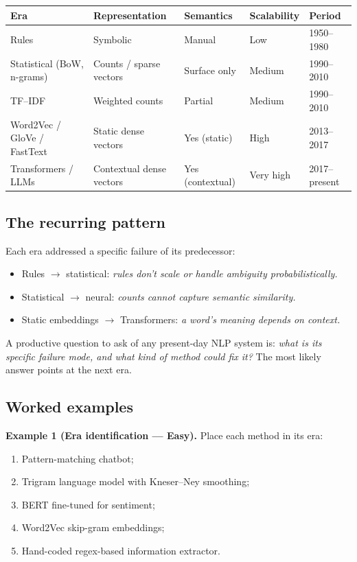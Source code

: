 \begin{center}
\begin{tabular}{|l|l|l|l|l|}
\hline
\textbf{Era} & \textbf{Representation} & \textbf{Semantics} & \textbf{Scalability} & \textbf{Period} \\
\hline
Rules & Symbolic & Manual & Low & 1950--1980 \\
Statistical (BoW, n-grams) & Counts / sparse vectors & Surface only & Medium & 1990--2010 \\
TF--IDF & Weighted counts & Partial & Medium & 1990--2010 \\
Word2Vec / GloVe / FastText & Static dense vectors & Yes (static) & High & 2013--2017 \\
Transformers / LLMs & Contextual dense vectors & Yes (contextual) & Very high & 2017--present \\
\hline
\end{tabular}
\end{center}

\subsection{The recurring pattern}

\begin{remark}
Each era addressed a specific failure of its predecessor:
\begin{itemize}
    \item Rules $\to$ statistical: \emph{rules don't scale or handle ambiguity probabilistically.}
    \item Statistical $\to$ neural: \emph{counts cannot capture semantic similarity.}
    \item Static embeddings $\to$ Transformers: \emph{a word's meaning depends on context.}
\end{itemize}
A productive question to ask of any present-day NLP system is: \emph{what is its specific failure mode, and what kind of method could fix it?} The most likely answer points at the next era.
\end{remark}

\subsection{Worked examples}

\textbf{Example 1 (Era identification --- Easy).}
Place each method in its era:
\begin{enumerate}
    \item Pattern-matching chatbot;
    \item Trigram language model with Kneser--Ney smoothing;
    \item BERT fine-tuned for sentiment;
    \item Word2Vec skip-gram embeddings;
    \item Hand-coded regex-based information extractor.
\end{enumerate}

